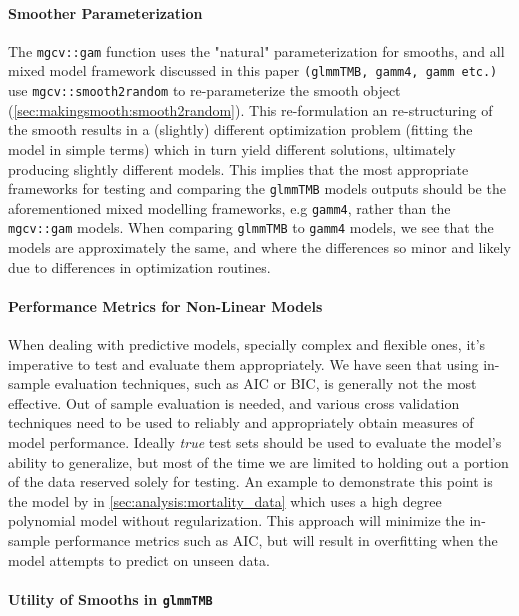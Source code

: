 \documentclass[12pt, twoside,hidelinks]{article}
\theoremstyle{definition}
\numberwithin{equation}{section}
\begin{document}
\paragraph{Smoother Parameterization}

The \texttt{mgcv::gam} function uses the "natural" parameterization for smooths, and all mixed model framework discussed in this paper \texttt{(glmmTMB, gamm4, gamm etc.)} use \texttt{mgcv::smooth2random} to re-parameterize the smooth object (\ref{sec:makingsmooth:smooth2random}). This re-formulation an re-structuring of the smooth results in a (slightly) different optimization problem (fitting the model in simple terms) which in turn yield different solutions, ultimately producing slightly different models. This implies that the most appropriate frameworks for testing and comparing the \texttt{glmmTMB} models outputs should be the aforementioned mixed modelling frameworks, e.g \texttt{gamm4}, rather than the \texttt{mgcv::gam} models. When comparing \texttt{glmmTMB} to \texttt{gamm4} models, we see that the models are approximately the same, and where the differences so minor and likely due to differences in optimization routines. 

\paragraph{Performance Metrics for Non-Linear Models}

When dealing with predictive models, specially complex and flexible ones, it's imperative to test and evaluate them appropriately. We have seen that using in-sample evaluation techniques, such as AIC or BIC, is generally not the most effective. Out of sample evaluation is needed, and various cross validation techniques need to be used to reliably and appropriately obtain measures of model performance. Ideally \textit{true }test sets should be used to evaluate the model's ability to generalize, but most of the time we are limited to holding out a portion of the data reserved solely for testing. An example to demonstrate this point is the model by \citet{grindheim} in \ref{sec:analysis:mortality_data} which uses a high degree polynomial model without regularization. This approach will minimize the in-sample performance metrics such as AIC, but will result in overfitting when the model attempts to predict on unseen data. 

\paragraph{Utility of Smooths in \texttt{glmmTMB}}
\end{document}
